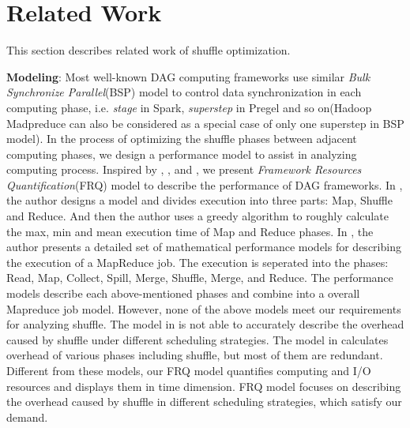 \section{Related Work}
This section describes related work of shuffle optimization.

{\color{blue}
\textbf{Modeling}: Most well-known DAG computing frameworks use similar \textit{Bulk Synchronize Parallel}(BSP)\cite{valiant1990bridging} model to control data synchronization in each computing phase, i.e. \textit{stage} in Spark, \textit{superstep} in Pregel\cite{malewicz2010pregel} and so on(Hadoop Madpreduce can also be considered as a special case of only one superstep in BSP model). 
In the process of optimizing the shuffle phases between adjacent computing phases, we design a performance model to assist in analyzing computing process.
Inspired by \cite{verma2011aria}, \cite{herodotou2011hadoop}, and \cite{polo2010performance}, we present \textit{Framework Resources Quantification}(FRQ) model to describe the performance of DAG frameworks.
In \cite{verma2011aria}, the author designs a model and divides execution into three parts: Map, Shuffle and Reduce. And then the author uses a greedy algorithm to roughly calculate the max, min and mean execution time of Map and Reduce phases.
In \cite{herodotou2011hadoop}, the author presents a detailed set of mathematical performance models for describing the execution of a MapReduce job. The execution is seperated into the phases: Read, Map, Collect, Spill, Merge, Shuffle, Merge, and Reduce. The performance models describe each above-mentioned phases and combine into a overall Mapreduce job model. 
However, none of the above models meet our requirements for analyzing shuffle.
The model in \cite{verma2011aria} is not able to accurately describe the overhead caused by shuffle under different scheduling strategies. The model in \cite{herodotou2011hadoop} calculates overhead of various phases including shuffle, but most of them are redundant. 
Different from these models, our FRQ model quantifies computing and I/O resources and displays them in time dimension. FRQ model focuses on describing the overhead caused by shuffle in different scheduling strategies, which satisfy our demand.
}

